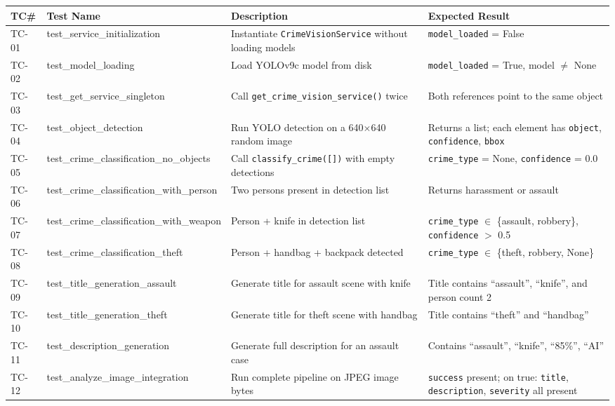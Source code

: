 \documentclass[12pt,a4paper]{report}
\begin{document}
\small
\begin{longtable}{@{}p{0.8cm}p{4.2cm}p{5.5cm}p{4cm}@{}}
\toprule
\textbf{TC\#} & \textbf{Test Name} & \textbf{Description} & \textbf{Expected Result} \\
\midrule
\endhead
TC-01 & test\_service\_initialization & Instantiate \texttt{CrimeVisionService} without loading models & \texttt{model\_loaded} = False \\
\addlinespace
TC-02 & test\_model\_loading & Load YOLOv9c model from disk & \texttt{model\_loaded} = True, model $\neq$ None \\
\addlinespace
TC-03 & test\_get\_service\_singleton & Call \texttt{get\_crime\_vision\_service()} twice & Both references point to the same object \\
\addlinespace
TC-04 & test\_object\_detection & Run YOLO detection on a 640$\times$640 random image & Returns a list; each element has \texttt{object}, \texttt{confidence}, \texttt{bbox} \\
\addlinespace
TC-05 & test\_crime\_classification\_no\_objects & Call \texttt{classify\_crime([])} with empty detections & \texttt{crime\_type} = None, \texttt{confidence} = 0.0 \\
\addlinespace
TC-06 & test\_crime\_classification\_with\_person & Two persons present in detection list & Returns harassment or assault \\
\addlinespace
TC-07 & test\_crime\_classification\_with\_weapon & Person + knife in detection list & \texttt{crime\_type} $\in$ \{assault, robbery\}, \texttt{confidence} $>$ 0.5 \\
\addlinespace
TC-08 & test\_crime\_classification\_theft & Person + handbag + backpack detected & \texttt{crime\_type} $\in$ \{theft, robbery, None\} \\
\addlinespace
TC-09 & test\_title\_generation\_assault & Generate title for assault scene with knife & Title contains ``assault'', ``knife'', and person count 2 \\
\addlinespace
TC-10 & test\_title\_generation\_theft & Generate title for theft scene with handbag & Title contains ``theft'' and ``handbag'' \\
\addlinespace
TC-11 & test\_description\_generation & Generate full description for an assault case & Contains ``assault'', ``knife'', ``85\%'', ``AI'' \\
\addlinespace
TC-12 & test\_analyze\_image\_integration & Run complete pipeline on JPEG image bytes & \texttt{success} present; on true: \texttt{title}, \texttt{description}, \texttt{severity} all present \\

\end{longtable}
\end{document}
